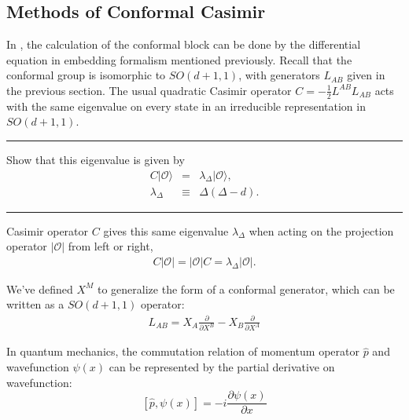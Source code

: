 \documentclass[12pt]{article}
\numberwithin{equation}{section}
\newcommand\be{\begin{eqnarray}}
\newcommand\ee{\end{eqnarray}}
\newcommand\cO{\mathcal{O}}
\newcommand\ptl\partial
\newcommand\<\langle
\renewcommand\>\rangle
\newcommand\nn{\nonumber}
\renewcommand\.{\cdot}
\newcommand\De{\Delta}
\renewcommand\l\lambda
\begin{document}
\subsection{Methods of Conformal Casimir}

In \cite{Dolan_2004}, the calculation of the conformal block can be done by the differential equation in embedding formalism mentioned previously. Recall that the conformal group is isomorphic to $SO(d+1,1)$, with generators $L_{AB}$ given in the previous section. The usual quadratic Casimir operator $C=-\frac 1 2 L^{AB}L_{AB}$ acts with the same eigenvalue on every state in an irreducible representation in $SO(d+1,1)$.  

\noindent\rule[0.5ex]{\linewidth}{1pt}
Show that this eigenvalue is given by
\be
C|\cO\> &=& \l_{\De}|\cO\>,\nn\\
\l_{\De} &\equiv& \De(\De-d).
\ee

\noindent\rule[0.5ex]{\linewidth}{1pt}

Casimir operator $C$ gives this same eigenvalue $\lambda_{\Delta}$ when acting on the projection operator $|\cO|$ from left or right,
\be
C|\cO|=|\cO| C = \l_{\De}|\cO|.
\ee

We've defined $X^{M}$ to generalize the form of a conformal generator, which can be written as a $SO(d+1,1)$ operator:
\be
\label{eq:conformalgeneratorinembeddingformalism}
L_{AB} = X_A\frac{\ptl }{\ptl X^{B}} - X_{B}\frac{\ptl }{\ptl X^A}
\ee

In quantum mechanics, the commutation relation of momentum operator $\hat{p}$ and wavefunction $\psi(x)$ can be represented by the partial derivative on wavefunction:
\begin{equation}
    \label{QM differential eq}
    \left[\hat{p},\psi(x)\right] = -i\frac{\partial\psi(x)}{\partial x}
\end{equation}
\end{document}
